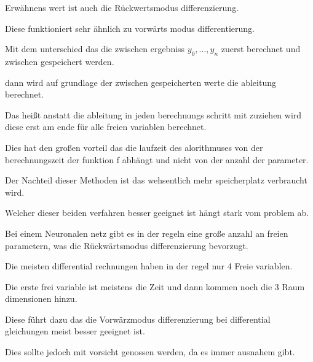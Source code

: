 Erwähnens wert ist auch die Rückwertsmodus differenzierung.

Diese funktioniert sehr ähnlich zu vorwärts modus differentierung.

Mit dem unterschied das die zwischen ergebniss $y_0, ... , y_n$ zuerst berechnet und zwischen gespeichert werden.

dann wird auf grundlage der zwischen gespeicherten werte die ableitung berechnet.

Das heißt anstatt die ableitung in jeden berechnungs schritt mit zuziehen wird diese erst am ende für alle freien variablen berechnet.

Dies hat den großen vorteil das die laufzeit des alorithmuses von der berechnungszeit der funktion f abhängt und nicht von der anzahl der parameter.

Der Nachteil dieser Methoden ist das wehsentlich mehr speicherplatz verbraucht wird.


Welcher dieser beiden verfahren besser geeignet ist hängt stark vom problem ab.

Bei einem Neuronalen netz gibt es in der regeln eine große anzahl an freien parametern, was die Rückwärtsmodus differenzierung bevorzugt.

Die meisten differential rechnungen haben in der regel nur 4 Freie variablen.

Die erste frei variable ist meistens die Zeit und dann kommen noch die 3 Raum dimensionen hinzu.

Diese führt dazu das die Vorwärzmodus differenzierung bei differential gleichungen meist besser geeignet ist.

Dies sollte jedoch mit vorsicht genossen werden, da es immer ausnahem gibt.






